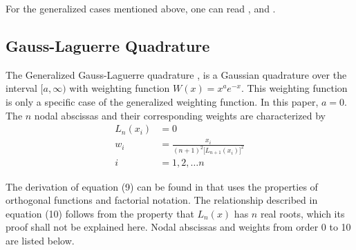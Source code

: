 \documentclass[a4paper, 11pt]{article}
\begin{document}
For the generalized cases mentioned above, one can read \cite{bib:assoc}, \cite{bib:lagdiff} and \cite{bib:delta}.

\subsection{Gauss-Laguerre Quadrature}
The Generalized Gauss-Laguerre quadrature \cite{bib:laguerre}, is a Gaussian quadrature over the interval $[a, \infty)$ with weighting function $W(x) = x^a e^{-x}$. This weighting function is only a specific case of the generalized weighting function. In this paper, $a=0$. The $n$ nodal abscissas and their corresponding weights are characterized by
\begin{align}\label{eqn:glint}
L_n(x_i) &= 0 \\
w_i &= \frac{x_i}{(n+1)^2\lbrack L_{n+1}(x_i) \rbrack^2} \\
i &= 1, 2, \ldots n
\end{align}

The derivation of equation (9) can be found in \cite{bib:laguerre} that uses the properties of orthogonal functions and factorial notation. The relationship described in equation (10) follows from the property that $L_n(x)$ has $n$ real roots, which its proof shall not be explained here. Nodal abscissas and weights from order 0 to 10 are listed below.
\end{document}
